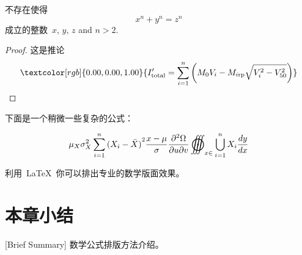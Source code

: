 \begin{theorem}[\heiti 费马]
  {\upshape\kaishu 不存在使得~
    \begin{equation}
      x^n+y^n=z^n
    \end{equation}
    成立的整数~$x$, $y$, $z$ and $n>2$. }
\end{theorem}

\begin{proof}
  {\upshape\kaishu 这是推论
    \begin{equation}
      \textcolor[rgb]{0.00,0.00,1.00}{
      I'_{{\rm{total}}} = \sum\limits_{i = 1}^n
      {\left( {M_0 V_i - M_{i{\rm{rp}}} \sqrt{V_i^2 - V_{50}^2}}\right)}}
    \end{equation}}
\end{proof}

下面是一个稍微一些复杂的公式：

\begin{equation}
  {\mu _X}\sigma _X^2\sum\limits_{i = 1}^n {{{({X_i} - \bar X)}^2}} \frac{{x - \mu }}{\sigma }\frac{{{\partial ^2}\Omega }}{{\partial u\partial v}}\mathop{{\int\!\!\!\!\!\int\!\!\!\!\!\int}\mkern-31.2mu \bigodot}\nolimits_{x \in }
  {\bigcup\limits_{i = 1}^n {{X_i}} \frac{{dy}}{{dx}}}
\end{equation}

利用~\LaTeX~你可以排出专业的数学版面效果。


\section*{本章小结}[Brief Summary]
数学公式排版方法介绍。

